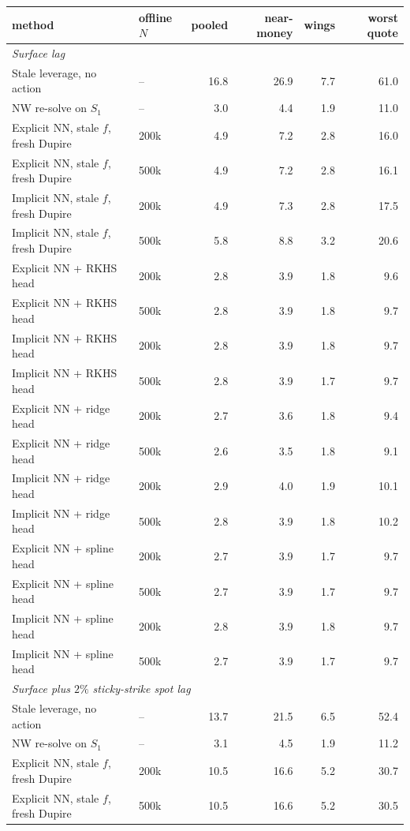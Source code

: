 \begin{tabular}{l l rrrr}
\toprule
method & offline $N$ & pooled & near-money & wings & worst quote\\
\midrule
\multicolumn{6}{l}{\emph{Surface lag}}\\
Stale leverage, no action & -- & 16.8 & 26.9 & 7.7 & 61.0\\
NW re-solve on $S_1$ & -- & 3.0 & 4.4 & 1.9 & 11.0\\
Explicit NN, stale $f$, fresh Dupire & 200k & 4.9 & 7.2 & 2.8 & 16.0\\
Explicit NN, stale $f$, fresh Dupire & 500k & 4.9 & 7.2 & 2.8 & 16.1\\
Implicit NN, stale $f$, fresh Dupire & 200k & 4.9 & 7.3 & 2.8 & 17.5\\
Implicit NN, stale $f$, fresh Dupire & 500k & 5.8 & 8.8 & 3.2 & 20.6\\
Explicit NN + RKHS head & 200k & 2.8 & 3.9 & 1.8 & 9.6\\
Explicit NN + RKHS head & 500k & 2.8 & 3.9 & 1.8 & 9.7\\
Implicit NN + RKHS head & 200k & 2.8 & 3.9 & 1.8 & 9.7\\
Implicit NN + RKHS head & 500k & 2.8 & 3.9 & 1.7 & 9.7\\
Explicit NN + ridge head & 200k & 2.7 & 3.6 & 1.8 & 9.4\\
Explicit NN + ridge head & 500k & 2.6 & 3.5 & 1.8 & 9.1\\
Implicit NN + ridge head & 200k & 2.9 & 4.0 & 1.9 & 10.1\\
Implicit NN + ridge head & 500k & 2.8 & 3.9 & 1.8 & 10.2\\
Explicit NN + spline head & 200k & 2.7 & 3.9 & 1.7 & 9.7\\
Explicit NN + spline head & 500k & 2.7 & 3.9 & 1.7 & 9.7\\
Implicit NN + spline head & 200k & 2.8 & 3.9 & 1.8 & 9.7\\
Implicit NN + spline head & 500k & 2.7 & 3.9 & 1.7 & 9.7\\
\midrule
\multicolumn{6}{l}{\emph{Surface plus $2\%$ sticky-strike spot lag}}\\
Stale leverage, no action & -- & 13.7 & 21.5 & 6.5 & 52.4\\
NW re-solve on $S_1$ & -- & 3.1 & 4.5 & 1.9 & 11.2\\
Explicit NN, stale $f$, fresh Dupire & 200k & 10.5 & 16.6 & 5.2 & 30.7\\
Explicit NN, stale $f$, fresh Dupire & 500k & 10.5 & 16.6 & 5.2 & 30.5\\

\end{tabular}
